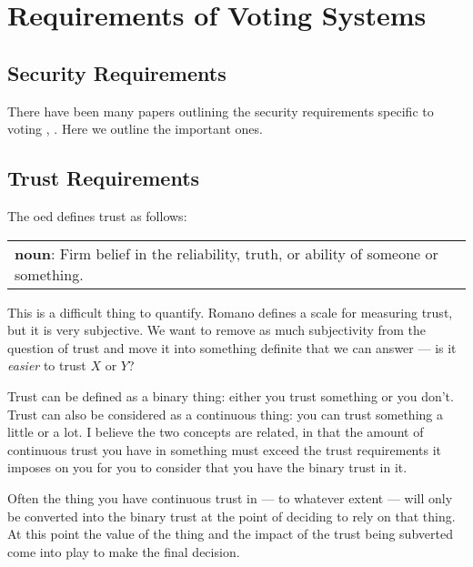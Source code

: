 
\chapter{Requirements of Voting Systems}
\label{ch:req}

\section{Security Requirements}
\label{ch:req:sec}

There have been many papers outlining the security requirements specific to voting \cite{epstein_electronic_2007}, \cite{delaune_formalising_nodate}. Here we outline the important ones.


\section{Trust Requirements}
\label{ch:req:trust}

The \gls{oed} defines trust as follows:

\vspace{1em}
\noindent \begin{tabular}{|p{}}
    \noindent \textbf{noun}: Firm belief in the reliability, truth, or ability of someone or something.
\end{tabular}
\vspace{1em}

This is a difficult thing to quantify. Romano \cite{romano_nature_2003} defines a scale for measuring trust, but it is very subjective. We want to remove as much subjectivity from the question of trust and move it into something definite that we can answer --- is it \emph{easier} to trust $X$ or $Y$?

Trust can be defined as a binary thing: either you trust something or you don't. Trust can also be considered as a continuous thing: you can trust something a little or a lot. I believe the two concepts are related, in that the amount of continuous trust you have in something must exceed the trust requirements it imposes on you for you to consider that you have the binary trust in it.

Often the thing you have continuous trust in --- to whatever extent --- will only be converted into the binary trust at the point of deciding to rely on that thing. At this point the value of the thing and the impact of the trust being subverted come into play to make the final decision.

